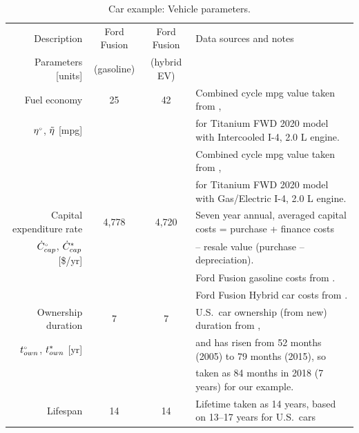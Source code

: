 \documentclass[12pt]{article}\usepackage[]{graphicx}\usepackage[]{xcolor}
\begin{document}
\begin{landscape}
\begin{table}
\footnotesize
\begin{center}
\caption{Car example: Vehicle parameters.} 
\label{tab:car_parameters}
\begin{tabular}{ r c c l }
  \toprule
    Description                  & Ford Fusion & Ford Fusion & Data sources and notes\\ 
    Parameters [units]                              & (gasoline) & (hybrid EV) &  \\
  \midrule
  Fuel economy                           & 25 & 42 & Combined cycle mpg value taken from \citet{Car_Connection:2020}, \\
  ${}{\eta}^{\scriptscriptstyle \circ}$, $\tilde{\eta}$ [mpg]             &           &          & for Titanium FWD 2020 model with Intercooled I-4, 2.0 L engine.   \\
                                                    &           &          & Combined cycle mpg value taken from \citet{Car_Connection:2020},\\
                                                    &           &          & for Titanium FWD 2020 model with Gas/Electric I-4, 2.0 L engine. \\
  \midrule
   Capital expenditure rate      & 4,778     & 4,720    & Seven year annual, averaged capital costs = purchase + finance costs  \\
   ${}{\dot{C}}^{\scriptscriptstyle \circ}_{cap}$, ${\dot{C}}^*_{cap}$ [\$/yr] &           &          & -- resale value (purchase -- depreciation).  \\
                                                    &           &          & Ford Fusion gasoline costs from \citet{Edmunds:2020_fusion_gasoline}. \\
                                                    &           &          & Ford Fusion Hybrid car costs from \citet{Edmunds:2020_fusion_hybrid}. \\
 \midrule
   Ownership duration            & 7  & 7  & U.S.\ car ownership (from new) duration from \citet{BusinessWire:2015}, \\
   ${}{t}^{\scriptscriptstyle \circ}_{own}$, ${t}^*_{own}$ [yr]        &           &          & and has risen from 52 months (2005) to 79 months (2015), so  \\
                                                    &           &          & taken as 84 months in 2018 (7 years) for our example. \\
 \midrule
   Lifespan                     & 14  & 14 & Lifetime taken as 14 years, based on 13--17 years for U.S.\ cars \\

\end{tabular}
\end{center}
\end{table}
\end{landscape}
\end{document}
